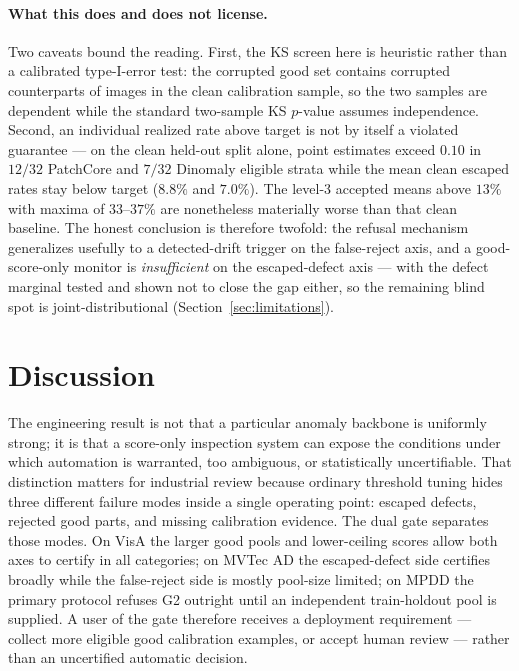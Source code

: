 \documentclass[preprint,11pt]{elsarticle}
\begin{document}
\paragraph{What this does and does not license.} Two caveats bound the reading. First, the KS
screen here is heuristic rather than a calibrated type-I-error test: the corrupted good set contains
corrupted counterparts of images in the clean calibration sample, so the two samples are dependent
while the standard two-sample KS $p$-value assumes independence. Second, an individual realized rate
above target is not by itself a violated guarantee --- on the clean held-out split alone,
point estimates exceed $0.10$ in $12/32$ PatchCore and $7/32$ Dinomaly eligible strata while the mean
clean escaped rates stay below target ($8.8\%$ and $7.0\%$). The level-3 accepted means above $13\%$
with maxima of $33$--$37\%$ are nonetheless materially worse than that clean baseline. The honest
conclusion is therefore twofold: the refusal mechanism generalizes usefully to a
detected-drift trigger on the false-reject axis, and a good-score-only monitor is
\emph{insufficient} on the escaped-defect axis --- with the defect marginal tested and shown
not to close the gap either, so the remaining blind spot is joint-distributional
(Section~\ref{sec:limitations}).

\section{Discussion}
\label{sec:discussion}

The engineering result is not that a particular anomaly backbone is uniformly strong; it is that a
score-only inspection system can expose the conditions under which automation is warranted, too
ambiguous, or statistically uncertifiable. That distinction matters for industrial review because
ordinary threshold tuning hides three different failure modes inside a single operating point:
escaped defects, rejected good parts, and missing calibration evidence. The dual gate separates
those modes. On VisA the larger good pools and lower-ceiling scores allow both axes to certify in
all categories; on MVTec AD the escaped-defect side certifies broadly while the false-reject side is
mostly pool-size limited; on MPDD the primary protocol refuses G2 outright until an independent
train-holdout pool is supplied. A user of the gate therefore receives a deployment requirement ---
collect more eligible good calibration examples, or accept human review --- rather than an
uncertified automatic decision.
\end{document}
